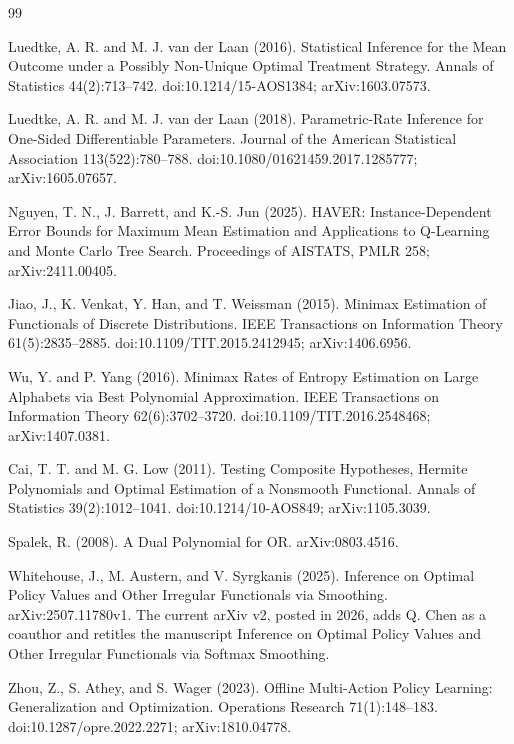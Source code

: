 \documentclass{article}
\begin{document}
\begin{thebibliography}{99}

   Luedtke, A. R. and M. J. van der Laan (2016). Statistical Inference for the Mean Outcome under a Possibly Non-Unique Optimal Treatment Strategy. Annals of Statistics 44(2):713--742. doi:10.1214/15-AOS1384; arXiv:1603.07573.

   Luedtke, A. R. and M. J. van der Laan (2018). Parametric-Rate Inference for One-Sided Differentiable Parameters. Journal of the American Statistical Association 113(522):780--788. doi:10.1080/01621459.2017.1285777; arXiv:1605.07657.

   Nguyen, T. N., J. Barrett, and K.-S. Jun (2025). HAVER: Instance-Dependent Error Bounds for Maximum Mean Estimation and Applications to Q-Learning and Monte Carlo Tree Search. Proceedings of AISTATS, PMLR 258; arXiv:2411.00405.

   Jiao, J., K. Venkat, Y. Han, and T. Weissman (2015). Minimax Estimation of Functionals of Discrete Distributions. IEEE Transactions on Information Theory 61(5):2835--2885. doi:10.1109/TIT.2015.2412945; arXiv:1406.6956.

   Wu, Y. and P. Yang (2016). Minimax Rates of Entropy Estimation on Large Alphabets via Best Polynomial Approximation. IEEE Transactions on Information Theory 62(6):3702--3720. doi:10.1109/TIT.2016.2548468; arXiv:1407.0381.

   Cai, T. T. and M. G. Low (2011). Testing Composite Hypotheses, Hermite Polynomials and Optimal Estimation of a Nonsmooth Functional. Annals of Statistics 39(2):1012--1041. doi:10.1214/10-AOS849; arXiv:1105.3039.

   Spalek, R. (2008). A Dual Polynomial for OR. arXiv:0803.4516.

   Whitehouse, J., M. Austern, and V. Syrgkanis (2025). Inference on Optimal Policy Values and Other Irregular Functionals via Smoothing. arXiv:2507.11780v1. The current arXiv v2, posted in 2026, adds Q. Chen as a coauthor and retitles the manuscript Inference on Optimal Policy Values and Other Irregular Functionals via Softmax Smoothing.

   Zhou, Z., S. Athey, and S. Wager (2023). Offline Multi-Action Policy Learning: Generalization and Optimization. Operations Research 71(1):148--183. doi:10.1287/opre.2022.2271; arXiv:1810.04778.


\end{thebibliography}
\end{document}
